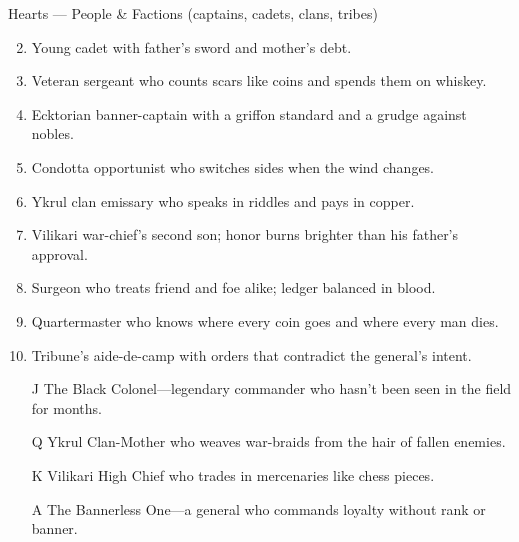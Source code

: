 Hearts --- People \& Factions (captains, cadets, clans, tribes)
\begin{enumerate}
\setcounter{enumi}{1}
\item Young cadet with father's sword and mother's debt.
\item Veteran sergeant who counts scars like coins and spends them on whiskey.
\item Ecktorian  banner-captain with a griffon standard and a grudge against nobles.
\item Condotta opportunist who switches sides when the wind changes.
\item Ykrul clan emissary who speaks in riddles and pays in copper.
\item Vilikari war-chief's second son; honor burns brighter than his father's approval.
\item Surgeon who treats friend and foe alike; ledger balanced in blood.
\item Quartermaster who knows where every coin goes and where every man dies.
\item Tribune's aide-de-camp with orders that contradict the general's intent.
\item[J] The Black Colonel---legendary commander who hasn't been seen in the field for months.
\item[Q] Ykrul Clan-Mother who weaves war-braids from the hair of fallen enemies.
\item[K] Vilikari High Chief who trades in mercenaries like chess pieces.
\item[A] The Bannerless One---a general who commands loyalty without rank or banner.
\end{enumerate}

